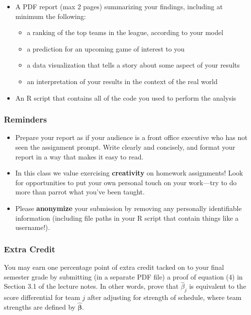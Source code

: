 \documentclass{article}
\begin{document}
        \begin{itemize}
          \item A PDF report (max 2 pages) summarizing your findings, including at minimum the following:
          \begin{itemize}
            \item a ranking of the top teams in the league, according to your model
            \item a prediction for an upcoming game of interest to you
            \item a data visualization that tells a story about some aspect of your results
            \item an interpretation of your results in the context of the real world
          \end{itemize}
          \item An R script that contains all of the code you used to perform the analysis
        \end{itemize}

      \subsubsection*{\sc Reminders}

        \begin{itemize}
          \item Prepare your report as if your audience is a front office executive who has not seen the assignment prompt. Write clearly and concisely, and format your report in a way that makes it easy to read.
          \item In this class we value exercising {\bf creativity} on homework assignments! Look for opportunities to put your own personal touch on your work---try to do more than parrot what you've been taught.
          \item Please {\bf anonymize} your submission by removing any personally identifiable information (including file paths in your R script that contain things like a username!).
        \end{itemize}

      \subsubsection*{\sc Extra Credit}

        You may earn one percentage point of extra credit tacked on to your final semester grade by submitting (in a separate PDF file) a proof of equation (4) in Section 3.1 of the lecture notes. In other words, prove that $\hat\beta_j$ is equivalent to the score differential for team $j$ after adjusting for strength of schedule, where team strengths are defined by $\boldsymbol{\hat\beta}$.
\end{document}
